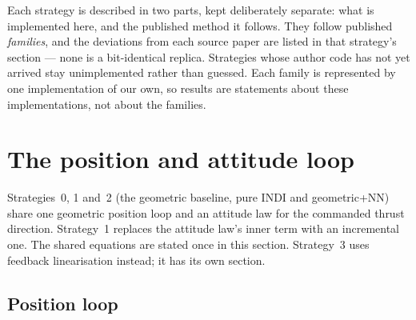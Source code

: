Each strategy is described in two parts, kept deliberately separate: what is implemented here, and
the published method it follows. They follow published \emph{families}, and the deviations from
each source paper are listed in that strategy's section — none is a bit-identical replica.
Strategies whose author code has not yet arrived stay unimplemented rather than guessed. Each family
is represented by one implementation of our own, so results are statements about these
implementations, not about the families.

\section{The position and attitude loop}
\label{sec:ctrl-common}

Strategies~0, 1 and~2 (the geometric baseline, pure INDI and geometric+NN) share one geometric
position loop and an attitude law for the commanded thrust direction. Strategy~1 replaces the
attitude law's inner term with an incremental one. The shared equations are stated once in this
section. Strategy~3 uses feedback linearisation instead; it has its own section.

\subsection{Position loop}

